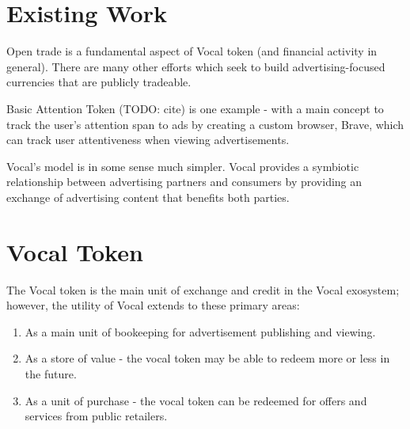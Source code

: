 \documentclass[conference]{IEEEtran}
\begin{document}

    \section{Existing Work}

    Open trade is a fundamental aspect of Vocal token (and financial activity in general). There are many other efforts which seek to build advertising-focused currencies that are publicly tradeable.

    Basic Attention Token (TODO: cite) is one example - with a main concept to track the user's attention span to ads by creating a custom browser, Brave, which can track user attentiveness when viewing advertisements. 

    Vocal's model is in some sense much simpler. Vocal provides a symbiotic relationship between advertising partners and consumers by providing an exchange of advertising content that benefits both parties.


    \section{Vocal Token}


    The Vocal token is the main unit of exchange and credit in the Vocal exosystem; however, the utility of Vocal extends to these primary areas:

    \begin{enumerate}
      \item As a main unit of bookeeping for advertisement publishing and viewing.
      \item As a store of value - the vocal token may be able to redeem more or less in the future.
      \item As a unit of purchase - the vocal token can be redeemed for offers and services from public retailers.
    \end{enumerate}
\end{document}
